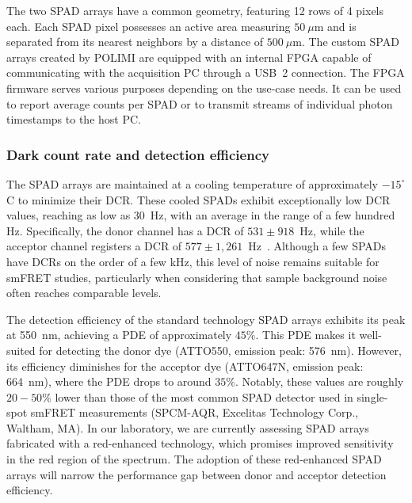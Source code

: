 The two \ac{SPAD} arrays have a common geometry, featuring 12 rows of 4 pixels each. 
Each \ac{SPAD} pixel possesses an active area measuring $50~\mu$m and is separated from its nearest neighbors by a distance of $500~\mu$m. 
The custom \ac{SPAD} arrays created by \ac{POLIMI} are equipped with an internal \ac{FPGA} capable of communicating with the acquisition PC through a USB~2 connection. 
The \ac{FPGA} firmware serves various purposes depending on the use-case needs.
It can be used to report average counts per \ac{SPAD} or to transmit streams of individual photon timestamps to the host PC.

\subsubsection{Dark count rate and detection efficiency}

The \ac{SPAD} arrays are maintained at a cooling temperature of approximately $-15^{\circ}$C to minimize their \ac{DCR}.
These cooled \ac{SPAD}s exhibit exceptionally low \ac{DCR} values, reaching as low as 30~Hz, with an average in the range of a few hundred Hz. 
Specifically, the donor channel has a \ac{DCR} of $531\pm918$~Hz, while the acceptor channel registers a \ac{DCR} of $577\pm1,261$~Hz~\cite{ingargiola_JCP_2018}. 
Although a few \ac{SPAD}s have \ac{DCR}s on the order of a few kHz, this level of noise remains suitable for smFRET studies, particularly when considering that sample background noise often reaches comparable levels.

The detection efficiency of the standard technology \ac{SPAD} arrays exhibits its peak at 550~nm, achieving a \ac{PDE} of approximately $45\%$. 
This \ac{PDE} makes it well-suited for detecting the donor dye (ATTO550, emission peak: 576~nm). 
However, its efficiency diminishes for the acceptor dye (ATTO647N, emission peak: 664~nm), where the \ac{PDE} drops to around $35\%$\cite{gulinatti_SPIE_2012, gulinatti_SPIE_2013, michalet_JSTQE_2014}. 
Notably, these values are roughly $20 - 50\%$ lower than those of the most common \ac{SPAD} detector used in single-spot smFRET measurements (SPCM-AQR, Excelitas Technology Corp., Waltham, MA)\cite{michalet_PRSB_2013}. 
In our laboratory, we are currently assessing \ac{SPAD} arrays fabricated with a red-enhanced technology, which promises improved sensitivity in the red region of the spectrum\cite{panzeri_SPIE_2013, ceccarelli_IEEEPTL_2018}. 
The adoption of these red-enhanced \ac{SPAD} arrays will narrow the performance gap between donor and acceptor detection efficiency.

